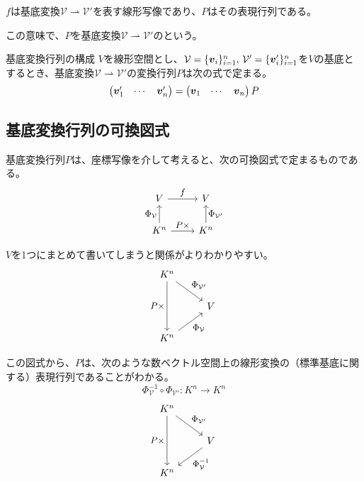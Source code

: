 \documentclass[../../../topic_linear-algebra]{subfiles}
\begin{document}
$f$は基底変換$\mathcal{V} \rightharpoonup \mathcal{V}'$を表す線形写像であり、$P$はその表現行列である。

この意味で、$P$を基底変換$\mathcal{V} \rightharpoonup \mathcal{V}'$のという。

\begin{theorem*}{基底変換行列の構成}
  $V$を線形空間とし、$\mathcal{V} = \{\vb*{v}_i\}_{i=1}^n,\, \mathcal{V}' = \{\vb*{v}'_i\}_{i=1}^n$を$V$の基底とするとき、基底変換$\mathcal{V} \rightharpoonup \mathcal{V}'$の変換行列$P$は次の式で定まる。
  \begin{equation*}
    \begin{pmatrix}
      \vb*{v}'_1 & \cdots & \vb*{v}'_n
    \end{pmatrix} = \begin{pmatrix}
      \vb*{v}_1 & \cdots & \vb*{v}_n
    \end{pmatrix} P
  \end{equation*}
\end{theorem*}

\subsection{基底変換行列の可換図式}

基底変換行列$P$は、座標写像を介して考えると、次の可換図式で定まるものである。
\begin{equation*}
  \begin{tikzcd}[every label/.append style = {font = \small}]
    V \arrow[r,"f"] & V \\
    K^n \arrow[u,"{\Phi_{\mathcal{V}}}"] \arrow[r,"P\times"] & K^n \arrow[u,"{\Phi_{\mathcal{V}'}}"']
  \end{tikzcd}
\end{equation*}

\br

$V$を1つにまとめて書いてしまうと関係がよりわかりやすい。
\begin{equation*}
  \begin{tikzcd}[every label/.append style = {font = \small}]
    K^n \arrow[dd, "P\times"'] \arrow[rd,"{\Phi_{\mathcal{V}'}}"] & \\
    & V \\
    K^n \arrow[ru,"{\Phi_{\mathcal{V}}}"']
  \end{tikzcd}
\end{equation*}

\br

この図式から、$P$は、次のような数ベクトル空間上の線形変換の（標準基底に関する）表現行列であることがわかる。
\begin{equation*}
  \Phi_{\mathcal{V}}^{-1} \circ \Phi_{\mathcal{V}'} \colon K^n \to K^n
\end{equation*}
\begin{equation*}
  \begin{tikzcd}[every label/.append style = {font = \small}]
    K^n \arrow[dd, "P\times"'] \arrow[rd,"{\Phi_{\mathcal{V}'}}"] & \\
    & V \arrow[ld,"{\Phi_{\mathcal{V}}^{-1}}"] \\
    K^n &
  \end{tikzcd}
\end{equation*}
\end{document}

